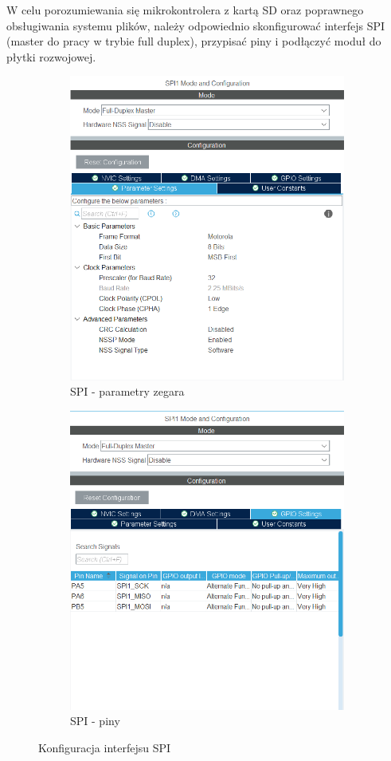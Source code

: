 \documentclass[11pt, a4paper]{article}
\begin{document}
W celu porozumiewania się mikrokontrolera z kartą SD oraz poprawnego obsługiwania systemu plików, należy odpowiednio skonfigurować interfejs SPI (master do pracy w trybie full duplex), przypisać piny i podłączyć moduł do płytki rozwojowej. 
\begin{figure}[h!]
\centering
\begin{subfigure}{.5\textwidth}
  \centering
  \includegraphics[width=.74\linewidth]{fig/SD/działanie_ukladu/spi.png}
  \caption{SPI - parametry zegara}
  \label{fig:sub1}
\end{subfigure}%
\begin{subfigure}{.5\textwidth}
  \centering
  \includegraphics[width=0.74\linewidth]{fig/SD/działanie_ukladu/spi2.png}
  \caption{SPI - piny}
  \label{fig:sub2}
\end{subfigure}
\caption{Konfiguracja interfejsu SPI}
\label{fig:test}
\end{figure}
\end{document}
